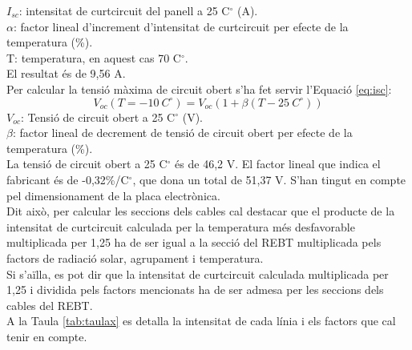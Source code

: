 \noindent $I_{sc}$: intensitat de curtcircuit del panell a 25 C$^{\circ}$ (A).\\
$\alpha$: factor lineal d'increment d'intensitat de curtcircuit per efecte de la temperatura (\%).\\
T: temperatura, en aquest cas 70 C$^{\circ}$.\\
\noindent El resultat és de 9,56 A.\\
%
\newline Per calcular la tensió màxima de circuit obert s'ha fet servir l'Equació \ref{eq:isc}:
\begin{equation} \label{eq:isc}
V_{oc}(T=-10\  C ^{\circ})= V_{oc} (1 + \beta (T-25 \ C^{\circ}))
\end{equation}
\noindent  $V_{oc}$: Tensió de circuit obert a 25 C$^{\circ}$ (V).\\
$\beta$: factor lineal de decrement de tensió de circuit obert per efecte de la temperatura (\%).\\
%
\newline La tensió de circuit obert a 25 C$^{\circ}$ és de 46,2 V. El factor lineal que indica el fabricant és de -0,32\%/C$^{\circ}$, que dona un total de 51,37 V. S'han tingut en compte pel dimensionament de la placa electrònica.\\
\newline Dit això, per calcular les seccions dels cables cal destacar que el producte de la intensitat de curtcircuit calculada per la temperatura més desfavorable multiplicada per 1,25 ha de ser igual a la secció del REBT multiplicada pels factors de radiació solar, agrupament i temperatura.\\
\newline Si s'aïlla, es pot dir que la intensitat de curtcircuit calculada multiplicada per 1,25 i dividida pels factors mencionats ha de ser admesa per les seccions dels cables del REBT.\\
\newline A la Taula \ref{tab:taulax} es detalla la intensitat de cada línia i els factors que cal tenir en compte.

